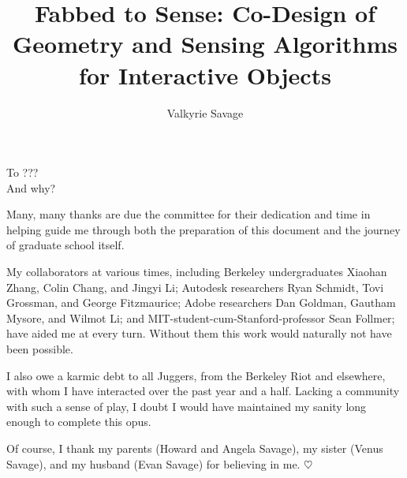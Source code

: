 \documentclass{ucbthesis}
\begin{document}



\title{Fabbed to Sense: Co-Design of Geometry and Sensing Algorithms for Interactive Objects}
\author{Valkyrie Savage}

\maketitle
\approvalpage
\copyrightpage



\begin{frontmatter}

\begin{dedication}
\null\vfil
\begin{center}
To ???\\\vspace{12pt}
And why?
\end{center}
\vfil\null
\end{dedication}

\tableofcontents
\clearpage
\listoffigures
\clearpage
\listoftables

\begin{acknowledgements}
Many, many thanks are due the committee for their dedication and time in helping guide me through both the preparation of this document and the journey of graduate school itself. 

My collaborators at various times, including Berkeley undergraduates Xiaohan Zhang, Colin Chang, and Jingyi Li; Autodesk researchers Ryan Schmidt, Tovi Grossman, and George Fitzmaurice; Adobe researchers Dan Goldman, Gautham Mysore, and Wilmot Li; and MIT-student-cum-Stanford-professor Sean Follmer; have aided me at every turn. Without them this work would naturally not have been possible.

I also owe a karmic debt to all Juggers, from the Berkeley Riot and elsewhere, with whom I have interacted over the past year and a half. Lacking a community with such a sense of play, I doubt I would have maintained my sanity long enough to complete this opus.

Of course, I thank my parents (Howard and Angela Savage), my sister (Venus Savage), and my husband (Evan Savage) for believing in me. $\heartsuit$
\end{acknowledgements}

\end{frontmatter}

\pagestyle{headings}











\printbibliography
\end{document}

